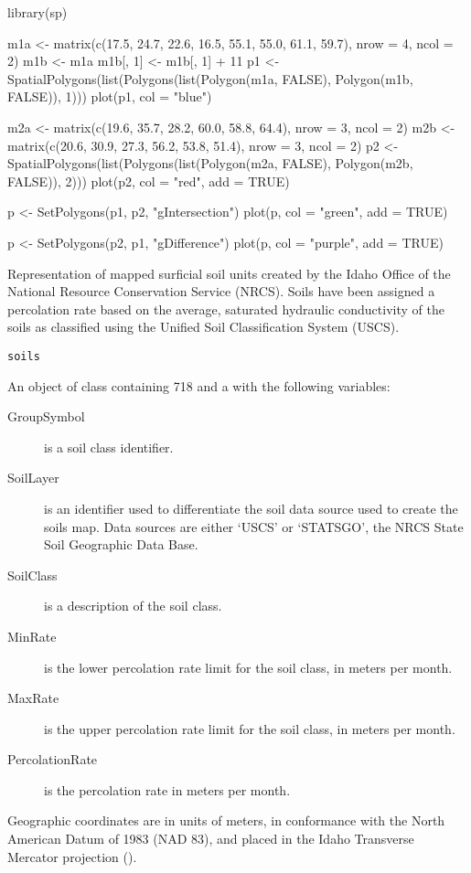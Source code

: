 \documentclass[a4paper]{book}
\begin{document}
%
\begin{Examples}
\begin{ExampleCode}
library(sp)

m1a <- matrix(c(17.5, 24.7, 22.6, 16.5, 55.1, 55.0, 61.1, 59.7), nrow = 4, ncol = 2)
m1b <- m1a
m1b[, 1] <- m1b[, 1] + 11
p1 <- SpatialPolygons(list(Polygons(list(Polygon(m1a, FALSE), Polygon(m1b, FALSE)), 1)))
plot(p1, col = "blue")

m2a <- matrix(c(19.6, 35.7, 28.2, 60.0, 58.8, 64.4), nrow = 3, ncol = 2)
m2b <- matrix(c(20.6, 30.9, 27.3, 56.2, 53.8, 51.4), nrow = 3, ncol = 2)
p2 <- SpatialPolygons(list(Polygons(list(Polygon(m2a, FALSE), Polygon(m2b, FALSE)), 2)))
plot(p2, col = "red", add = TRUE)

p <- SetPolygons(p1, p2, "gIntersection")
plot(p, col = "green", add = TRUE)

p <- SetPolygons(p2, p1, "gDifference")
plot(p, col = "purple", add = TRUE)
\end{ExampleCode}
\end{Examples}
%
\begin{Description}\relax
Representation of mapped surficial soil units created by the Idaho Office of the National Resource Conservation Service (NRCS).
Soils have been assigned a percolation rate based on the average, saturated hydraulic conductivity of the soils as classified using the Unified Soil Classification System (USCS).
\end{Description}
%
\begin{Usage}
\begin{verbatim}
soils
\end{verbatim}
\end{Usage}
%
\begin{Format}
An object of  class containing 718  and a  with the following variables:
\begin{description}

\item[GroupSymbol] is a soil class identifier.
\item[SoilLayer] is an identifier used to differentiate the soil data source used to create the soils map.
Data sources are either `USCS' or `STATSGO', the NRCS State Soil Geographic Data Base.
\item[SoilClass] is a description of the soil class.
\item[MinRate] is the lower percolation rate limit for the soil class, in meters per month.
\item[MaxRate] is the upper percolation rate limit for the soil class, in meters per month.
\item[PercolationRate] is the percolation rate in meters per month.

\end{description}

Geographic coordinates are in units of meters, in conformance with the North American Datum of 1983 (NAD 83), and placed in the
Idaho Transverse Mercator projection ().
\end{Format}
\end{document}
